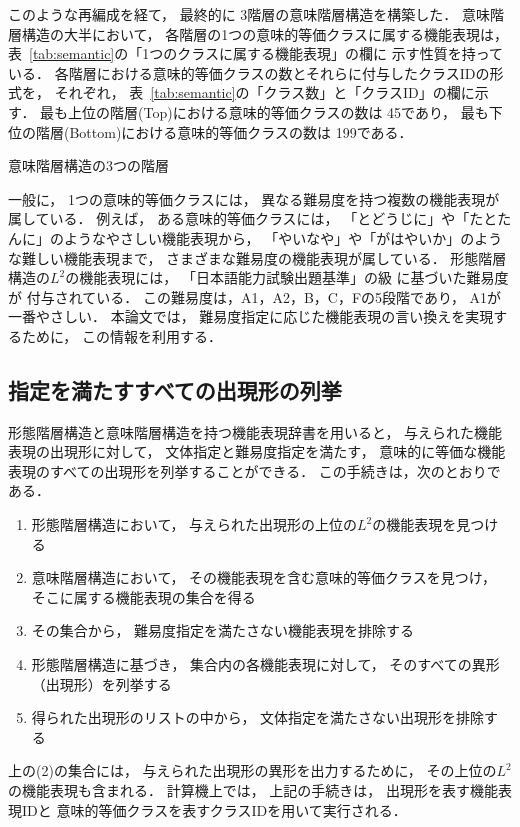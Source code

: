 \documentclass[japanese]{jnlp_1.4}
\begin{document}
このような再編成を経て，
最終的に 3階層の意味階層構造を構築した．
意味階層構造の大半において，
各階層の1つの意味的等価クラスに属する機能表現は，
表~\ref{tab:semantic}の「1つのクラスに属する機能表現」の欄に
示す性質を持っている．
各階層における意味的等価クラスの数とそれらに付与したクラスIDの形式を，
それぞれ，
表~\ref{tab:semantic}の「クラス数」と「クラスID」の欄に示す．
最も上位の階層(Top)における意味的等価クラスの数は 45であり，
最も下位の階層(Bottom)における意味的等価クラスの数は 199である．

\begin{table}[t]
\caption{意味階層構造の3つの階層}
\label{tab:semantic}

\end{table}

一般に，
1つの意味的等価クラスには，
異なる難易度を持つ複数の機能表現が属している．
例えば，
ある意味的等価クラスには，
「とどうじに」や「たとたんに」のようなやさしい機能表現から，
「やいなや」や「がはやいか」のような難しい機能表現まで，
さまざまな難易度の機能表現が属している．
形態階層構造の$L^2$の機能表現には，
「日本語能力試験出題基準」の級
に基づいた難易度が
付与されている．
この難易度は，A1，A2，B，C，Fの5段階であり，
A1が一番やさしい．
本論文では，
難易度指定に応じた機能表現の言い換えを実現するために，
この情報を利用する．


\subsection{指定を満たすすべての出現形の列挙}
\label{subsec:enumerate}

形態階層構造と意味階層構造を持つ機能表現辞書を用いると，
与えられた機能表現の出現形に対して，
文体指定と難易度指定を満たす，
意味的に等価な機能表現のすべての出現形を列挙することができる．
この手続きは，次のとおりである．
\begin{enumerate}
\item 形態階層構造において，
      与えられた出現形の上位の$L^2$の機能表現を見つける
\item 意味階層構造において，
      その機能表現を含む意味的等価クラスを見つけ，
      そこに属する機能表現の集合を得る
\item その集合から，
      難易度指定を満たさない機能表現を排除する
\item 形態階層構造に基づき，
      集合内の各機能表現に対して，
      そのすべての異形（出現形）を列挙する
\item 得られた出現形のリストの中から，
      文体指定を満たさない出現形を排除する
\end{enumerate}
上の(2)の集合には，
与えられた出現形の異形を出力するために，
その上位の$L^2$の機能表現も含まれる．
計算機上では，
上記の手続きは，
出現形を表す機能表現IDと
意味的等価クラスを表すクラスIDを用いて実行される．
\end{document}
